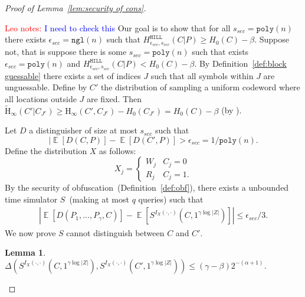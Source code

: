 \documentclass[11pt]{article}
\newtheorem{lemma}[theorem]{Lemma}
\newcommand{\defref}[1]{\mbox{Definition~\ref{#1}}}
\newcommand{\lemref}[1]{\mbox{Lemma~\ref{#1}}}
\DeclareMathOperator*{\expe}{\mathbb{E}}
\newcommand{\hill}{\ensuremath{\mathtt{HILL}}\xspace}
\newcommand{\poly}{\ensuremath{\mathtt{poly}}\xspace}
\newcommand{\ngl}{\ensuremath{\mathtt{ngl}}\xspace}
\newcommand{\Hoo}{\mathrm{H}_\infty}
\newcommand{\Hav}{\tilde{\mathrm{H}}_\infty}
\newcommand{\authnote}[2]{{\textcolor{red}{\textsf{#1 notes: }\textcolor{blue}{ #2}}\marginpar{\textcolor{red}{\textbf{!!!!!}}}}}
\newcommand{\authnote}[2]{}
\newcommand{\lnote}[1]{{\authnote{Leo}{#1}}}
\begin{document}
\begin{proof}[Proof of \lemref{lem:security of cons}]
\label{app:security of main cons}

\lnote{I need to check this}
 Our goal is to show that for all $s_{sec} = \poly(n)$ there exists $\epsilon_{sec} =\ngl(n)$ such that $H^{\hill}_{\epsilon_{sec}, s_{sec}}(C|P)\geq H_0(C)- \beta$. %
Suppose not, that is suppose there is some $s_{sec} = \poly(n)$ such that exists $\epsilon_{sec} = \poly(n)$ and $H^{\hill}_{\epsilon_{sec}, s_{sec}}(C|P) < H_0(C)-\beta$.
By \defref{def:block guessable} there exists a set of indices $J$ such that all symbols within $J$ are unguessable.  Define by $C'$ the distribution of sampling a uniform codeword where all locations outside $J$ are fixed.  Then
$\Hav(C' | C_{J^c}) \ge \Hoo(C', C_{J^c}) - H_0(C_{J^c})  = H_0(C) - \beta$ (by \cite[Lemma 2.2b]{DBLP:journals/siamcomp/DodisORS08}).

Let $D$ a distinguisher of size at most $s_{sec}$ such that
\[
| \expe[D(C, P)] - \expe[D(C', P)] > \epsilon_{sec} = 1/\poly(n).
\]
Define the distribution $X$ as follows:
\[X_j =
\begin{cases}
W_j & C_j = 0\\
R_j & C_j = 1.
\end{cases}\]  By the security of obfuscation~(\defref{def:obf}), there exists a unbounded time simulator $S$~(making at most $q$ queries) such that
\begin{align}
\label{eq:dist before}
|\expe [D(P_1,..., P_\gamma, C)] - \expe [S^{I_X(\cdot, \cdot)}(C, 1^{\gamma \log |Z|})] |\leq \epsilon_{sec}/3.
\end{align}
We now prove $S$ cannot distinguish between $C$ and $C'$.
\begin{lemma}
\label{lem:sim cannot distinguish}
$\Delta(S^{I_X(\cdot, \cdot)}(C, 1^{\gamma \log |Z|}), S^{I_X(\cdot, \cdot)}(C', 1^{\gamma \log |Z|})) \le (\gamma-\beta) 2^{-(\alpha+1)}$.
\end{lemma}


\end{proof}
\end{document}
